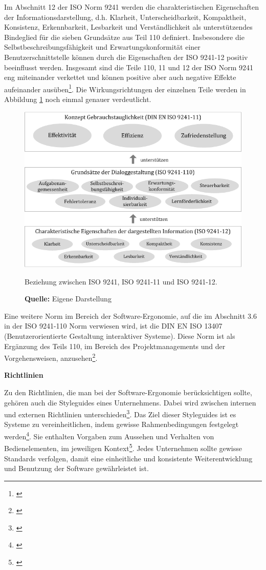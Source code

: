Im Abschnitt 12 der ISO Norm 9241 werden die charakteristischen Eigenschaften der Informationsdarstellung, d.h. Klarheit, Unterscheidbarkeit, Kompaktheit, Konsistenz, Erkennbarkeit, Lesbarkeit und Verständlichkeit als unterstützendes Bindeglied für die sieben Grundsätze aus Teil 110 definiert. Insbesondere die Selbstbeschreibungsfähigkeit und Erwartungskonformität einer Benutzerschnittstelle können durch die Eigenschaften der ISO 9241-12 positiv beeinflusst werden. Insgesamt sind die Teile 110, 11 und 12 der ISO Norm 9241 eng miteinander verkettet und können positive aber auch negative Effekte aufeinander ausüben\footnote{\cite[vgl.][Kap. 6]{ISO9241-110}}. Die Wirkungsrichtungen der einzelnen Teile werden in Abbildung \ref{fig:beziehungIsoNormen} noch einmal genauer verdeutlicht.
\begin{figure}[H]
  \centering
  \includegraphics[scale=0.80]{img/Beziehung_ISO9241_ISO9241-11_ISO9241-12.png}
  \caption{Beziehung zwischen ISO 9241, ISO 9241-11 und ISO 9241-12.}
  \caption*{\textbf{Quelle:} Eigene Darstellung \citep[vgl.][]{ISO9241-110}}
  \label{fig:beziehungIsoNormen}
\end{figure}
Eine weitere Norm im Bereich der Software-Ergonomie, auf die im Abschnitt 3.6 in der ISO 9241-110 Norm verwiesen wird, ist die DIN EN ISO 13407 (Benutzerorientierte Gestaltung interaktiver Systeme). Diese Norm ist als Ergänzung des Teils 110, im Bereich des Projektmanagements und der Vorgehensweisen, anzusehen\footnote{\cite[vgl.][58]{Schneider2008}}.

\textbf{Richtlinien}

Zu den Richtlinien, die man bei der Software-Ergonomie berücksichtigen sollte, gehören auch die Styleguides eines Unternehmens. Dabei wird zwischen internen und externen Richtlinien unterschieden\footnote{\cite[vgl.][74]{Richter2013}}. Das Ziel dieser Styleguides ist es Systeme zu vereinheitlichen, indem gewisse Rahmenbedingungen festgelegt werden\footnote{\cite[vgl.][]{Sarodnick2011}}. Sie enthalten Vorgaben zum Aussehen und Verhalten von Bedienelementen, im jeweiligen Kontext\footnote{\cite[vgl.][72]{Richter2013}}. Jedes Unternehmen sollte gewisse Standards verfolgen, damit eine einheitliche und konsistente Weiterentwicklung und Benutzung der Software gewährleistet ist.

